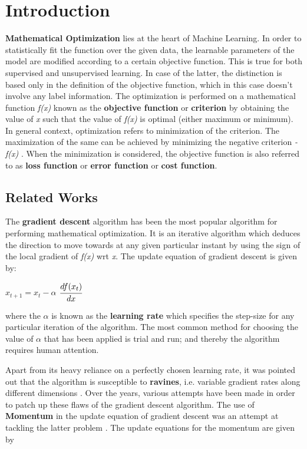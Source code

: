 \documentclass{article}
\begin{document}
\section{Introduction}
\textbf{Mathematical Optimization} lies at the heart of Machine Learning. In order to statistically fit the function over the given data, the learnable parameters of the model are modified according to a certain objective function. This is true for both supervised and unsupervised learning. In case of the latter, the distinction is based only in the definition of the objective function, which in this case doesn’t involve any label information. The optimization is performed on a mathematical function \textit{f(x)} known as the \textbf{objective function} or \textbf{criterion} by obtaining the value of \textit{x} such that the value of \textit{f(x)} is optimal (either maximum or minimum). In general context, optimization refers to minimization of the criterion. The maximization of the same can be achieved by minimizing the negative criterion\textit{ -f(x)} \cite{goodfellow-et-al:deep-learning}. When the minimization is considered, the objective function is also referred to as \textbf{loss function} or \textbf{error function} or \textbf{cost function}.

\subsection{Related Works}
The \textbf{gradient descent} algorithm \cite{cauchy:gradient-descent} has been the most popular algorithm for performing mathematical optimization. It is an iterative algorithm which deduces the direction to move towards at any given particular instant by using the sign of the local gradient of \textit{f(x)} wrt \textit{x}. The update equation of gradient descent is given by:

\begin{center}
	$x_{t + 1} = x_{t} - \alpha $ $\cfrac{df(x_t)}{dx}$
\end{center}

where the $\alpha$ is known as the \textbf{learning rate} which specifies the step-size for any particular iteration of the algorithm. The most common method for choosing the value of $\alpha$ that has been applied is trial and run; and thereby the algorithm requires human attention.


Apart from its heavy reliance on a perfectly chosen learning rate, it was pointed out that the algorithm is susceptible to \textbf{ravines}, i.e. variable gradient rates along different dimensions \cite{sutton:gradient-descent-problems}. Over the years, various attempts have been made in order to patch up these flaws of the gradient descent algorithm. The use of \textbf{Momentum} in the update equation of gradient descent was an attempt at tackling the latter problem \cite{qian:momentum}. The update equations for the momentum are given by
\end{document}
